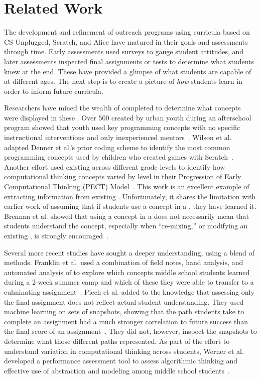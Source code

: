 \section{Related Work}
The development and refinement of outreach programs using curricula based on CS
Unplugged, Scratch, and Alice have matured in their goals and assessments
through time. Early assessments used surveys to gauge student attitudes, and
later assessments inspected final assignments or tests to determine what
students knew at the end. These have provided a glimpse of what students are
capable of at different ages. The next step is to create a picture of
\emph{how} students learn in order to inform future curricula.

Researchers have mined the wealth of completed  to determine what
concepts were displayed in these . Over 500  created by
urban youth during an afterschool program showed that youth used key
programming concepts with no specific instructional interventions and only
inexperienced mentors~\cite{Maloney:2008:PCU:1352135.1352260}. Wilson et
al. adapted Denner et al.'s prior coding scheme to identify the most common
programming concepts used by children who created games with
Scratch~\cite{Denner:2012:CGC:2072695.2073050, wilson12}. Another effort used
existing  across different grade levels to identify how
computational thinking concepts varied by level in their Progression of Early
Computational Thinking (PECT)
Model~\cite{Seiter:2013:MLP:2493394.2493403}. This work is an excellent example
of extracting information from existing . Unfortunately, it shares
the limitation with earlier work of assuming that if students use a concept in
a \sprogram{}, they have learned it. Brennan et al. showed that using a concept
in a \sprogram{} does not necessarily mean that students understand the
concept, especially when ``re-mixing,'' or modifying an existing \sprogram{},
is strongly encouraged~\cite{brennan12}.

Several more recent studies have sought a deeper understanding, using a blend
of methods. Franklin et al. used a combination of field notes, hand analysis,
and automated analysis of  to explore which concepts middle school
students learned during a 2-week summer camp and which of these they were able
to transfer to a culminating assignment~\cite{Boe:2013:HLS:2445196.2445265,
  Franklin:2013:SBO}. Piech et al. added to the knowledge that assessing only
the final assignment does not reflect actual student understanding. They used
machine learning on sets of snapshots, showing that the path students take to
complete an assignment had a much stronger correlation to future success than
the final score of an assignment~\cite{Piech:2012:MSL:2157136.2157182}. They
did not, however, inspect the snapshots to determine what those different paths
represented. As part of the effort to understand variation in computational
thinking across students, Werner et al. developed a performance assessment tool
to assess algorithmic thinking and effective use of abstraction and modeling
among middle school students~\cite{Werner:2012:FPA:2157136.2157200}.

